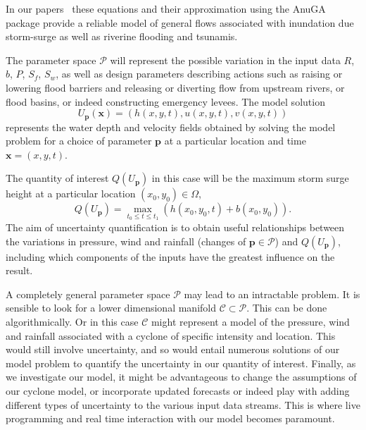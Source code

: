 In our papers~\parencite{anugamanual,nielsen2005hydrodynamic}  these
equations and their approximation using the  AnuGA package provide a reliable
model of general flows associated with inundation due storm-surge as well as riverine flooding and tsunamis.

The parameter space $\mathcal{P}$ will represent the possible variation in the input data $R$, $b$, $P$, $S_f$, $S_w$, as well as design parameters describing actions such as raising or lowering flood barriers and releasing or diverting flow from upstream rivers, or flood basins, or indeed constructing emergency levees. 
The model solution 
$$
U_{\mathbf{p}} (\mathbf{x})  = (  h(x,y,t) , u(x,y,t) ,  v(x,y,t) )
$$
represents the water depth and velocity fields obtained by solving the model problem for a choice of parameter $\mathbf{p}$ at a particular location and time $\mathbf{x} = (x,y,t)$.

The quantity of interest $Q(U_{\mathbf{p}})$ in this case will be the maximum storm surge height at a particular location $(x_0, y_0) \in \Omega$,
$$ 
Q(U_{\mathbf{p}})  = \max_{t_0 \leq t \leq t_1} \left( h(x_0,y_0,t) + b(x_0,y_0) \right).
$$
The aim of  uncertainty quantification is to obtain useful relationships between the variations in pressure, wind and rainfall (changes of $\mathbf{p} \in \mathcal{P}$) and $Q(U_{\mathbf{p}})$, including which components of the inputs  have the greatest influence on the result. 

A completely general parameter space $\mathcal{P}$ may lead to an intractable problem. It is sensible to look for a lower dimensional manifold $\mathcal{C} \subset \mathcal{P}$. This can be done algorithmically. Or in this case $\mathcal{C}$ might represent a model of the pressure, wind and rainfall associated with a cyclone of specific intensity and location. This would still involve uncertainty, and so would entail numerous solutions of our model problem to quantify the uncertainty in our quantity of interest. Finally, as we investigate our model, it might be advantageous to change the assumptions of our cyclone model, or incorporate updated forecasts or indeed play with adding different types of uncertainty to the various input data streams. This is where live programming and real time interaction with our model becomes paramount. 